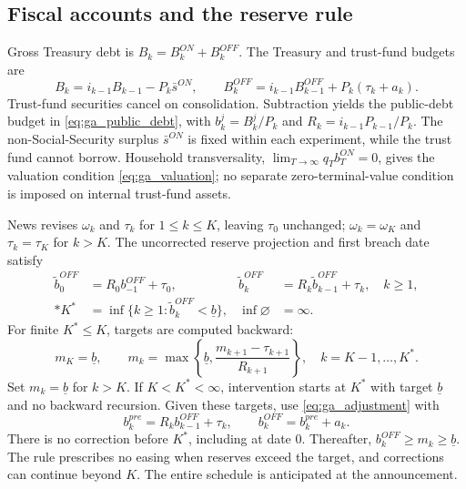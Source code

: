 \documentclass[12pt]{article}%
\theoremstyle{remark}
\begin{document}
\subsection{Fiscal accounts and the reserve rule}
Gross Treasury debt is $B_k=B_k^{ON}+B_k^{OFF}$. The Treasury and trust-fund budgets are
\begin{equation}
 B_k=i_{k-1}B_{k-1}-P_k\bar s^{ON},
 \qquad B_k^{OFF}=i_{k-1}B_{k-1}^{OFF}+P_k(\tau_k+a_k).
 \label{eq:ga_nominal_budgets}
\end{equation}
Trust-fund securities cancel on consolidation. Subtraction yields the public-debt budget in \eqref{eq:ga_public_debt}, with $b_k^j=B_k^j/P_k$ and $R_k=i_{k-1}P_{k-1}/P_k$. The non-Social-Security surplus $\bar s^{ON}$ is fixed within each experiment, while the trust fund cannot borrow. Household transversality, $\lim_{T\to\infty}q_Tb_T^{ON}=0$, gives the valuation condition \eqref{eq:ga_valuation}; no separate zero-terminal-value condition is imposed on internal trust-fund assets.

News revises $\omega_k$ and $\tau_k$ for $1\leq k\leq K$, leaving $\tau_0$ unchanged; $\omega_k=\omega_K$ and $\tau_k=\tau_K$ for $k>K$. The uncorrected reserve projection and first breach date satisfy
\begin{align}
 \widetilde b_0^{OFF}&=R_0b_{-1}^{OFF}+\tau_0,
 &\widetilde b_k^{OFF}&=R_k\widetilde b_{k-1}^{OFF}+\tau_k,
 \quad k\geq1,\nonumber\\*
 K^*&=\inf\{k\geq1:\widetilde b_k^{OFF}<\underline b\},
 &\inf\varnothing&=\infty.
 \label{eq:ga_projection}
\end{align}
For finite $K^*\leq K$, targets are computed backward:
\begin{equation}
 m_K=\underline b,\qquad
 m_k=\max\left\{\underline b,
 \frac{m_{k+1}-\tau_{k+1}}{R_{k+1}}\right\},
 \quad k=K-1,\ldots,K^*.
 \label{eq:ga_targets}
\end{equation}
Set $m_k=\underline b$ for $k>K$. If $K<K^*<\infty$, intervention starts at $K^*$ with target $\underline b$ and no backward recursion. Given these targets, use \eqref{eq:ga_adjustment} with
\begin{equation}
 b_k^{pre}=R_kb_{k-1}^{OFF}+\tau_k,
 \qquad b_k^{OFF}=b_k^{pre}+a_k.
 \label{eq:ga_actual_reserves}
\end{equation}
There is no correction before $K^*$, including at date 0. Thereafter, $b_k^{OFF}\geq m_k\geq\underline b$. The rule prescribes no easing when reserves exceed the target, and corrections can continue beyond $K$. The entire schedule is anticipated at the announcement.
\end{document}
